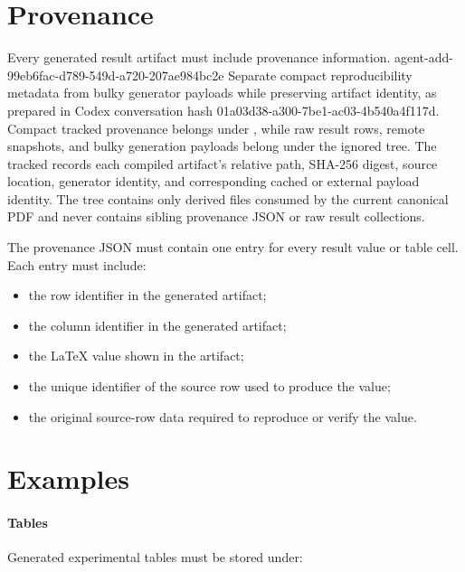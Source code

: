 \section*{Provenance}
Every generated result artifact must include provenance information.
\agentProposedEdit
  {agent-add-99eb6fac-d789-549d-a720-207ae984bc2e}
  {Separate compact reproducibility metadata from bulky generator payloads while preserving artifact identity, as prepared in Codex conversation hash 01a03d38-a300-7be1-ac03-4b540a4f117d.}
  {}
  {Compact tracked provenance belongs under , while raw result rows, remote snapshots, and bulky generation payloads belong under the ignored  tree.
The tracked  records each compiled artifact's relative path, SHA-256 digest, source location, generator identity, and corresponding cached or external payload identity.
The  tree contains only derived files consumed by the current canonical PDF and never contains sibling provenance JSON or raw result collections.}

The provenance JSON must contain one entry for every result value or table cell.
Each entry must include:
\begin{itemize}
    \item the row identifier in the generated artifact;
    \item the column identifier in the generated artifact;
    \item the LaTeX value shown in the artifact;
    \item the unique identifier of the source row used to produce the value;
    \item the original source-row data required to reproduce or verify the value.
\end{itemize}


\section*{Examples}
\paragraph{Tables}
Generated experimental tables must be stored under:


